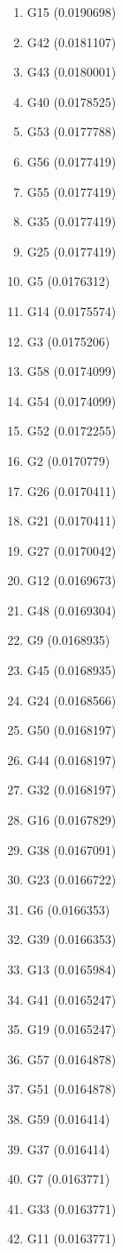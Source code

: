 \begin{enumerate}
\item G15 (0.0190698)
\item G42 (0.0181107)
\item G43 (0.0180001)
\item G40 (0.0178525)
\item G53 (0.0177788)
\item G56 (0.0177419)
\item G55 (0.0177419)
\item G35 (0.0177419)
\item G25 (0.0177419)
\item G5 (0.0176312)
\item G14 (0.0175574)
\item G3 (0.0175206)
\item G58 (0.0174099)
\item G54 (0.0174099)
\item G52 (0.0172255)
\item G2 (0.0170779)
\item G26 (0.0170411)
\item G21 (0.0170411)
\item G27 (0.0170042)
\item G12 (0.0169673)
\item G48 (0.0169304)
\item G9 (0.0168935)
\item G45 (0.0168935)
\item G24 (0.0168566)
\item G50 (0.0168197)
\item G44 (0.0168197)
\item G32 (0.0168197)
\item G16 (0.0167829)
\item G38 (0.0167091)
\item G23 (0.0166722)
\item G6 (0.0166353)
\item G39 (0.0166353)
\item G13 (0.0165984)
\item G41 (0.0165247)
\item G19 (0.0165247)
\item G57 (0.0164878)
\item G51 (0.0164878)
\item G59 (0.016414)
\item G37 (0.016414)
\item G7 (0.0163771)
\item G33 (0.0163771)
\item G11 (0.0163771)

\end{enumerate}
